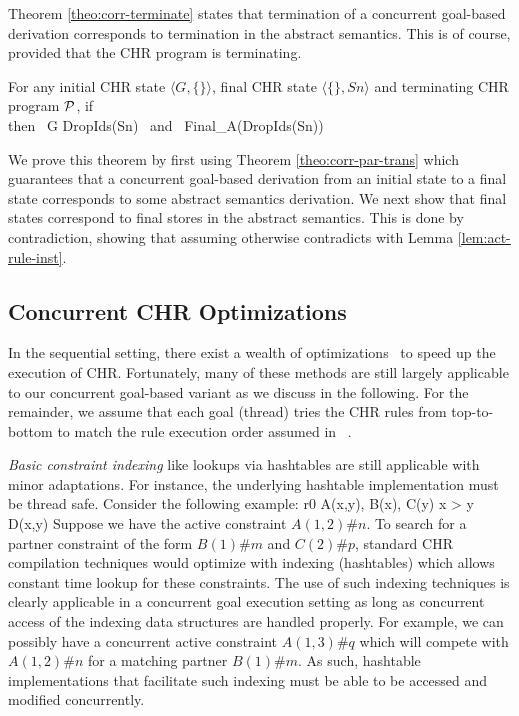 \documentclass{tlp}
\begin{document}
Theorem \ref{theo:corr-terminate} states that termination of a concurrent goal-based derivation
corresponds to termination in the abstract semantics. This is of course, provided that the
CHR program is terminating.

\begin{theorem}  \label{theo:corr-terminate}
   For any initial CHR state $\langle G,\{\} \rangle$, final CHR state $\langle \{\},Sn \rangle$ and
   terminating CHR program $\cal P$,
     \mbox{if }  \partransstar {} \\
     \mbox{then } G \abstransstar DropIds(Sn) \mbox{ and } Final_{\cal A}(DropIds(Sn))
   \eda
\end{theorem}

We prove this theorem by first using Theorem \ref{theo:corr-par-trans} which guarantees that
a concurrent goal-based derivation from an initial state to a final state corresponds to 
some abstract semantics derivation. We next show that final states correspond to final
stores in the abstract semantics. This is done by contradiction, showing that assuming
otherwise contradicts with Lemma \ref{lem:act-rule-inst}.

\subsection{Concurrent CHR Optimizations} \label{sec:concurrent-chr-opt}

In the sequential setting, there exist
a wealth of optimizations~\cite{greg:thesis,DBLP:conf/iclp/Schrijvers05,DBLP:conf/iclp/SneyersSD05}
to speed up the execution of CHR.
Fortunately, many of these methods are still largely applicable to our concurrent goal-based 
variant as we discuss in the following. For the remainder, we assume that each goal (thread) tries the CHR 
rules from top-to-bottom to match the rule execution order assumed in
~\cite{greg:thesis,DBLP:conf/iclp/Schrijvers05,DBLP:conf/iclp/SneyersSD05}.

{\em Basic constraint indexing} like lookups via hashtables are still applicable with minor adaptations. For 
instance, the underlying hashtable implementation must be thread safe. Consider the following example:
  r0 \atsign A(x,y), B(x), C(y) \simparrow x > y \mid D(x,y)
\eda
Suppose we have the active constraint $A(1,2)\#n$. To search for a
partner constraint of the form $B(1)\#m$ and $C(2)\#p$, standard CHR compilation techniques would 
optimize with indexing (hashtables) which allows constant time lookup for these constraints. 
The use of such indexing techniques is clearly applicable in a concurrent goal execution setting 
as long as concurrent access of the indexing data structures are handled properly. For example,
we can possibly have a concurrent active constraint $A(1,3)\#q$ which will compete with $A(1,2)\#n$ 
for a matching partner $B(1)\#m$. As such, hashtable implementations that facilitate such indexing 
must be able to be accessed and modified concurrently. 
\end{document}
